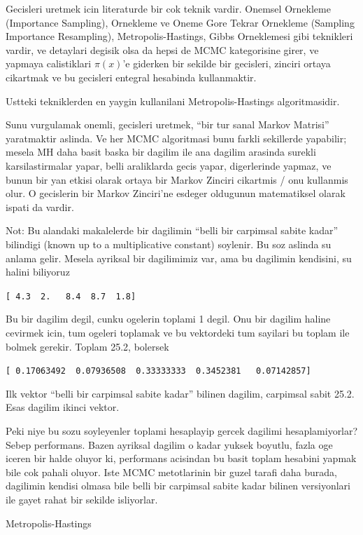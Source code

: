 \documentclass[12pt,fleqn]{article}\usepackage{../common}
\begin{document}
Gecisleri uretmek icin literaturde bir cok teknik vardir.  Onemsel
Ornekleme (Importance Sampling), Ornekleme ve Oneme Gore Tekrar Ornekleme
(Sampling Importance Resampling), Metropolis-Hastings, Gibbs Orneklemesi
gibi teknikleri vardir, ve detaylari degisik olsa da hepsi de MCMC
kategorisine girer, ve yapmaya calistiklari $\pi(x)$'e giderken bir sekilde
bir gecisleri, zinciri ortaya cikartmak ve bu gecisleri entegral hesabinda
kullanmaktir.

Ustteki tekniklerden en yaygin kullanilani Metropolis-Hastings
algoritmasidir. 

Sunu vurgulamak onemli, gecisleri uretmek, ``bir tur sanal Markov Matrisi''
yaratmaktir aslinda. Ve her MCMC algoritmasi bunu farkli sekillerde
yapabilir; mesela MH daha basit baska bir dagilim ile ana dagilim arasinda
surekli karsilastirmalar yapar, belli araliklarda gecis yapar, digerlerinde
yapmaz, ve bunun bir yan etkisi olarak ortaya bir Markov Zinciri cikartmis
/ onu kullanmis olur. O gecislerin bir Markov Zinciri'ne esdeger oldugunun
matematiksel olarak ispati da vardir.

Not: Bu alandaki makalelerde bir dagilimin ``belli bir carpimsal sabite
kadar'' bilindigi (known up to a multiplicative constant) soylenir. Bu soz
aslinda su anlama gelir. Mesela ayriksal bir dagilimimiz var, ama bu
dagilimin kendisini, su halini biliyoruz

\verb![ 4.3  2.   8.4  8.7  1.8]!

Bu bir dagilim degil, cunku ogelerin toplami 1 degil. Onu bir dagilim
haline cevirmek icin, tum ogeleri toplamak ve bu vektordeki tum sayilari bu
toplam ile bolmek gerekir. Toplam 25.2, bolersek

\verb![ 0.17063492  0.07936508  0.33333333  0.3452381   0.07142857]!

Ilk vektor ``belli bir carpimsal sabite kadar'' bilinen dagilim, carpimsal
sabit 25.2. Esas dagilim ikinci vektor. 

Peki niye bu sozu soyleyenler toplami hesaplayip gercek dagilimi
hesaplamiyorlar? Sebep performans. Bazen ayriksal dagilim o kadar yuksek
boyutlu, fazla oge iceren bir halde oluyor ki, performans acisindan bu
basit toplam hesabini yapmak bile cok pahali oluyor. Iste MCMC metotlarinin
bir guzel tarafi daha burada, dagilimin kendisi olmasa bile belli bir
carpimsal sabite kadar bilinen versiyonlari ile gayet rahat bir sekilde
isliyorlar.

Metropolis-Hastings
\end{document}
